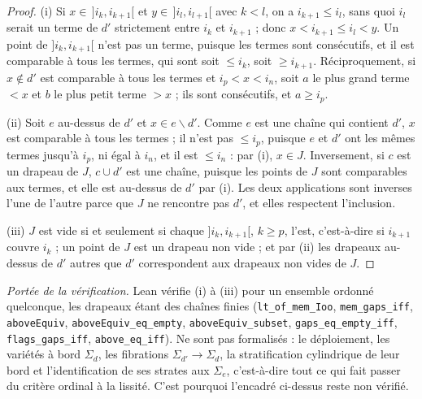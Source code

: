 \begin{proof}
(i) Si $x \in \,]i_k, i_{k+1}[$ et $y \in \,]i_l, i_{l+1}[$ avec $k < l$, on a $i_{k+1} \leq i_l$, sans quoi $i_l$ serait un terme de $d'$ strictement entre $i_k$ et $i_{k+1}$ ; donc $x < i_{k+1} \leq i_l < y$. Un point de $]i_k, i_{k+1}[$ n'est pas un terme, puisque les termes sont consécutifs, et il est comparable à tous les termes, qui sont soit $\leq i_k$, soit $\geq i_{k+1}$. Réciproquement, si $x \notin d'$ est comparable à tous les termes et $i_p < x < i_n$, soit $a$ le plus grand terme $< x$ et $b$ le plus petit terme $> x$ ; ils sont consécutifs, et $a \geq i_p$.

(ii) Soit $e$ au-dessus de $d'$ et $x \in e \smallsetminus d'$. Comme $e$ est une chaîne qui contient $d'$, $x$ est comparable à tous les termes ; il n'est pas $\leq i_p$, puisque $e$ et $d'$ ont les mêmes termes jusqu'à $i_p$, ni égal à $i_n$, et il est $\leq i_n$ : par (i), $x \in J$. Inversement, si $c$ est un drapeau de $J$, $c \cup d'$ est une chaîne, puisque les points de $J$ sont comparables aux termes, et elle est au-dessus de $d'$ par (i). Les deux applications sont inverses l'une de l'autre parce que $J$ ne rencontre pas $d'$, et elles respectent l'inclusion.

(iii) $J$ est vide si et seulement si chaque $]i_k, i_{k+1}[$, $k \geq p$, l'est, c'est-à-dire si $i_{k+1}$ couvre $i_k$ ; un point de $J$ est un drapeau non vide ; et par (ii) les drapeaux au-dessus de $d'$ autres que $d'$ correspondent aux drapeaux non vides de $J$.
\end{proof}

{\small\noindent\emph{Portée de la vérification.} Lean vérifie (i) à (iii) pour un ensemble ordonné quelconque, les drapeaux étant des chaînes finies (\texttt{lt\_of\_mem\_Ioo}, \texttt{mem\_gaps\_iff}, \texttt{aboveEquiv}, \texttt{aboveEquiv\_eq\_empty}, \texttt{aboveEquiv\_subset}, \texttt{gaps\_eq\_empty\_iff}, \texttt{flags\_gaps\_iff}, \texttt{above\_eq\_iff}). Ne sont pas formalisés : le déploiement, les variétés à bord $\Sigma_d$, les fibrations $\Sigma_{d'} \to \Sigma_d$, la stratification cylindrique de leur bord et l'identification de ses strates aux $\Sigma_e$, c'est-à-dire tout ce qui fait passer du critère ordinal à la lissité. C'est pourquoi l'encadré ci-dessus reste non vérifié.\par}

